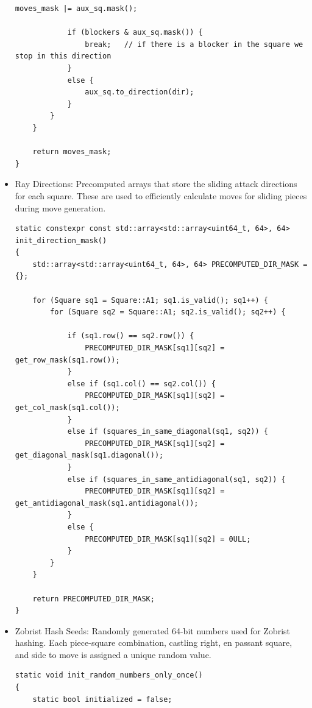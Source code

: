 \begin{itemize}
\begin{lstlisting}[breaklines=true, frame=single, caption={Initialization of bishop attack tables}]
            moves_mask |= aux_sq.mask();

            if (blockers & aux_sq.mask()) {
                break;   // if there is a blocker in the square we stop in this direction
            }
            else {
                aux_sq.to_direction(dir);
            }
        }
    }

    return moves_mask;
}
\end{lstlisting}

    \item Ray Directions: Precomputed arrays that store the sliding attack directions for each square. These are used to efficiently calculate moves for sliding pieces during move generation.
    
\begin{lstlisting}[breaklines=true, frame=single, caption={Initialization of directions masks}]
static constexpr const std::array<std::array<uint64_t, 64>, 64> init_direction_mask()
{
    std::array<std::array<uint64_t, 64>, 64> PRECOMPUTED_DIR_MASK = {};

    for (Square sq1 = Square::A1; sq1.is_valid(); sq1++) {
        for (Square sq2 = Square::A1; sq2.is_valid(); sq2++) {

            if (sq1.row() == sq2.row()) {
                PRECOMPUTED_DIR_MASK[sq1][sq2] = get_row_mask(sq1.row());
            }
            else if (sq1.col() == sq2.col()) {
                PRECOMPUTED_DIR_MASK[sq1][sq2] = get_col_mask(sq1.col());
            }
            else if (squares_in_same_diagonal(sq1, sq2)) {
                PRECOMPUTED_DIR_MASK[sq1][sq2] = get_diagonal_mask(sq1.diagonal());
            }
            else if (squares_in_same_antidiagonal(sq1, sq2)) {
                PRECOMPUTED_DIR_MASK[sq1][sq2] = get_antidiagonal_mask(sq1.antidiagonal());
            }
            else {
                PRECOMPUTED_DIR_MASK[sq1][sq2] = 0ULL;
            }
        }
    }

    return PRECOMPUTED_DIR_MASK;
}
\end{lstlisting}
    
    \item Zobrist Hash Seeds: Randomly generated 64-bit numbers used for Zobrist hashing. Each piece-square combination, castling right, en passant square, and side to move is assigned a unique random value.
    
\begin{lstlisting}[breaklines=true, frame=single, caption={Initialization of seeds}]
static void init_random_numbers_only_once()
{
    static bool initialized = false;


\end{lstlisting}
\end{itemize}

